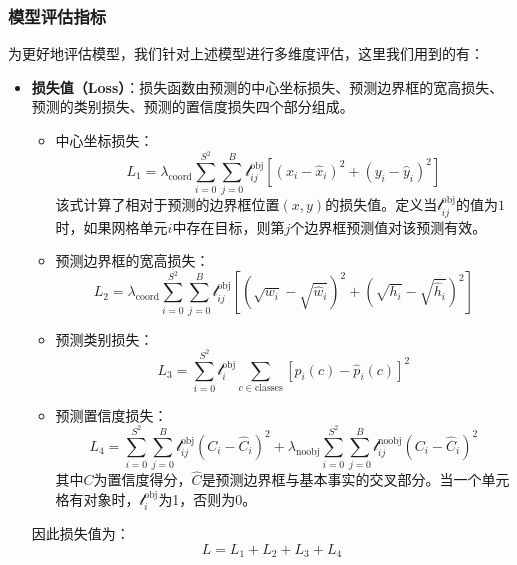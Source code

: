 \documentclass{MathorCupmodeling}
\begin{document}
	\subsubsection{模型评估指标}
	为更好地评估模型，我们针对上述模型进行多维度评估，这里我们用到的有：
	\begin{itemize}
		\item \textbf{损失值（Loss）}：损失函数由预测的中心坐标损失、预测边界框的宽高损失、预测的类别损失、预测的置信度损失四个部分组成\textcolor{blue}{\cite{LOSS}}。
		\begin{itemize}
			\item {\heiti 中心坐标损失}：
		\begin{equation}
			L_1=\lambda_{\text{coord}}\sum\limits_{i=0}^{S^2}\sum\limits_{j=0}^{B}\mathcal{l}_{ij}^{\text{obj}}\left[\left(x_i-\hat{x}_i\right)^2+\left(y_i-\hat{y}_i\right)^2\right]
		\end{equation}
		该式计算了相对于预测的边界框位置$\left(x,y\right)$的损失值。定义当$\mathcal{l}_{ij}^{\text{obj}}$的值为$1$时，如果网格单元$i$中存在目标，则第$j$个边界框预测值对该预测有效。
			\item {\heiti 预测边界框的宽高损失}：
			\begin{equation}
				L_2=\lambda_{\text{coord}}\sum\limits_{i=0}^{S^2}\sum\limits_{j=0}^{B}\mathcal{l}_{ij}^{\text{obj}}\left[\left(\sqrt{w_i}-\sqrt{\hat{w}_i}\right)^2+\left(\sqrt{h_i}-\sqrt{\hat{h}_i}\right)^2\right]
			\end{equation}
			\item {\heiti 预测类别损失}：
			\begin{equation}
				L_3=\sum\limits_{i=0}^{S^2}\mathcal{l}_{i}^{\text{obj}}\sum\limits_{c\in\text{classes}}\left[p_i\left(c\right)-\hat{p}_i\left(c\right)\right]^2
			\end{equation}
			\item {\heiti 预测置信度损失}：
			\begin{equation}
				L_4=\sum\limits_{i=0}^{S^2}\sum\limits_{j=0}^{B}\mathcal{l}_{ij}^{\text{obj}}\left(C_i-\hat{C}_i\right)^2+\lambda_{\text{noobj}}\sum\limits_{i=0}^{S^2}\sum\limits_{j=0}^{B}\mathcal{l}_{ij}^{\text{noobj}}\left(C_i-\hat{C}_i\right)^2
			\end{equation}
			其中$C$为置信度得分，$\hat{C}$是预测边界框与基本事实的交叉部分。当一个单元格有对象时，$\mathcal{l}_{i}^{\text{obj}}$为1，否则为0。
			\end{itemize}
			因此损失值为：
			\begin{equation}
				L=L_1+L_2+L_3+L_4
			\end{equation}

\end{itemize}
\end{document}
